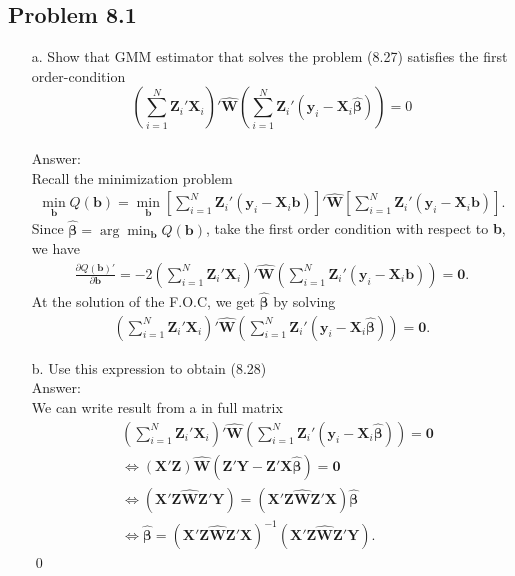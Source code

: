 \documentclass[10pt]{article}
\begin{document}
\subsection*{Problem 8.1}
\begin{enumerate}
\item[a.] Show that GMM estimator that solves the problem (8.27) satisfies the first order-condition
\[\left(\sum_{i=1}^N \textbf{Z}_i'\textbf{X}_i\right)'\hat{\textbf{W}}\left(\sum_{i=1}^N \textbf{Z}_i'(\textbf{y}_i-\textbf{X}_i \hat{\pmb{\beta}})\right)=0\]
\\ Answer: \\
Recall the minimization problem
\begin{align*}
    \min_\textbf{b} Q(\textbf{b}) = \min_\textbf{b} \left[\sum_{i=1}^N \textbf{Z}_i'(\textbf{y}_i-\textbf{X}_i \textbf{b})\right]'\hat{\textbf{W}}\left[\sum_{i=1}^N \textbf{Z}_i'(\textbf{y}_i-\textbf{X}_i \textbf{b})\right].
\end{align*}
Since $\hat{\pmb{\beta}}=\arg\min_\textbf{b} Q(\textbf{b})$, take the first order condition with respect to \textbf{b}, we have
\begin{align*}
    \frac{\partial Q(\textbf{b})'}{\partial \textbf{b}}=-2\left(\sum_{i=1}^N \textbf{Z}_i'\textbf{X}_i\right)'\hat{\textbf{W}}\left(\sum_{i=1}^N \textbf{Z}_i'(\textbf{y}_i-\textbf{X}_i \textbf{b})\right)=\textbf{0}.
\end{align*}
At the solution of the F.O.C, we get $\hat{\pmb{\beta}}$ by solving
\begin{align*}
    \left(\sum_{i=1}^N \textbf{Z}_i'\textbf{X}_i\right)'\hat{\textbf{W}}\left(\sum_{i=1}^N \textbf{Z}_i'(\textbf{y}_i-\textbf{X}_i \hat{\pmb{\beta}})\right)=\textbf{0}.
\end{align*}
\item[b.] Use this expression to obtain (8.28)
\\ Answer: \\
We can write result from a in full matrix
\begin{align*}
    &\left(\sum_{i=1}^N \textbf{Z}_i'\textbf{X}_i\right)'\hat{\textbf{W}}\left(\sum_{i=1}^N \textbf{Z}_i'(\textbf{y}_i-\textbf{X}_i \hat{\pmb{\beta}})\right)=\textbf{0}\\
    &\Leftrightarrow (\textbf{X}'\textbf{Z})\hat{\textbf{W}}(\textbf{Z}'\textbf{Y}-\textbf{Z}'\textbf{X}\hat{\pmb{\beta}})=\textbf{0}\\
    &\Leftrightarrow (\textbf{X}'\textbf{Z}\hat{\textbf{W}}\textbf{Z}'\textbf{Y})=(\textbf{X}'\textbf{Z}\hat{\textbf{W}}\textbf{Z}'\textbf{X})\hat{\pmb{\beta}}\\
    &\Leftrightarrow \hat{\pmb{\beta}}=(\textbf{X}'\textbf{Z}\hat{\textbf{W}}\textbf{Z}'\textbf{X})^{-1}(\textbf{X}'\textbf{Z}\hat{\textbf{W}}\textbf{Z}'\textbf{Y}).
\end{align*}\qed
\end{enumerate}
\end{document}
